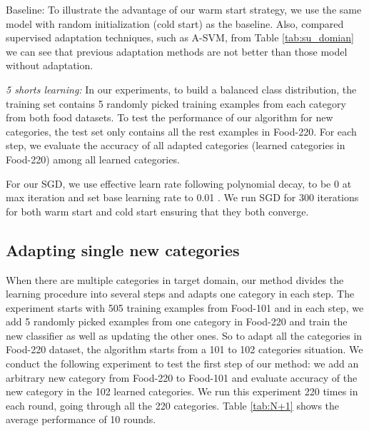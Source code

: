 
Baseline: To illustrate the advantage of our warm start strategy, we use the same model with random initialization (cold start) as the baseline.
Also, compared supervised adaptation techniques, such as A-SVM, from Table \ref{tab:su_domian} we can see that previous adaptation methods are not better than those model without adaptation.%

\emph{5 shorts learning:} In our experiments, to build a balanced class distribution, the training set contains 5 randomly picked training examples from each category from both food datasets. To test the performance of our algorithm for new categories, the test set only contains all the rest examples in Food-220. For each step, we evaluate the accuracy of all adapted categories (learned categories in Food-220) among all learned categories.

For our SGD, we use effective learn rate following polynomial decay, to be 0 at max iteration and set base learning rate to 0.01 \cite{jia2014caffe}. We run SGD for 300 iterations for both warm start and cold start ensuring that they both converge.

\subsection{Adapting single new categories}
When there are multiple categories in target domain, our method divides the learning procedure into several steps and adapts one category in each step. The experiment starts with 505 training examples from Food-101 and in each step, we add 5 randomly picked examples from one category in Food-220 and train the new classifier as well as updating the other ones. So to adapt all the categories in Food-220 dataset, the algorithm starts from a 101 to 102 categories situation. We conduct the following experiment to test the first step of our method: we add an arbitrary new category from Food-220 to Food-101 and evaluate accuracy of the new category in the 102 learned categories. We run this experiment 220 times in each round, going through all the 220 categories. Table \ref{tab:N+1} shows the average performance of 10 rounds.

